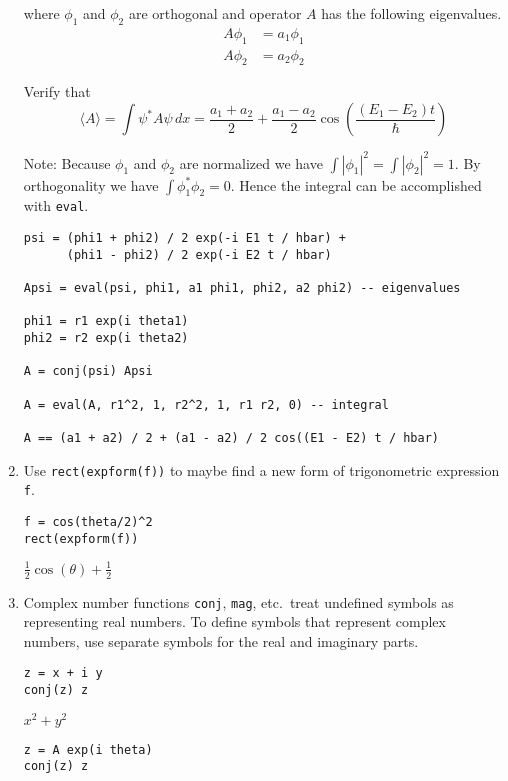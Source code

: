 \begin{enumerate}
where $\phi_1$ and $\phi_2$ are orthogonal and operator $A$ has the following eigenvalues.
\begin{align*}
A\phi_1&=a_1\phi_1
\\
A\phi_2&=a_2\phi_2
\end{align*}

Verify that
\begin{equation*}
\langle A\rangle
=\int\psi^*A\psi\,dx
=\frac{a_1+a_2}{2}+\frac{a_1-a_2}{2}\cos\left(\frac{(E_1-E_2)t}{\hbar}\right)
\end{equation*}

Note: Because $\phi_1$ and $\phi_2$ are normalized we have $\int|\phi_1|^2=\int|\phi_2|^2=1$.
By orthogonality we have $\int\phi_1^*\phi_2=0$.
Hence the integral can be accomplished with \verb$eval$.

{\color{blue}
\begin{verbatim}
psi = (phi1 + phi2) / 2 exp(-i E1 t / hbar) +
      (phi1 - phi2) / 2 exp(-i E2 t / hbar)

Apsi = eval(psi, phi1, a1 phi1, phi2, a2 phi2) -- eigenvalues

phi1 = r1 exp(i theta1)
phi2 = r2 exp(i theta2)

A = conj(psi) Apsi

A = eval(A, r1^2, 1, r2^2, 1, r1 r2, 0) -- integral

A == (a1 + a2) / 2 + (a1 - a2) / 2 cos((E1 - E2) t / hbar)
\end{verbatim}}

\item
Use \verb$rect(expform(f))$ to maybe find a new form
of trigonometric expression \verb$f$.

{\color{blue}
\begin{verbatim}
f = cos(theta/2)^2
rect(expform(f))
\end{verbatim}}

$\frac{1}{2}\cos(\theta)+\frac{1}{2}$

\item
Complex number functions \verb$conj$, \verb$mag$, etc.~treat undefined symbols as
representing real numbers.
To define symbols that represent complex numbers, use separate symbols for the
real and imaginary parts.

{\color{blue}
\begin{verbatim}
z = x + i y
conj(z) z
\end{verbatim}}

$x^2+y^2$

{\color{blue}
\begin{verbatim}
z = A exp(i theta)
conj(z) z
\end{verbatim}}


\end{enumerate}

